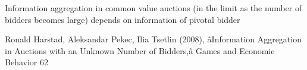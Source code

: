 \cite{kremer2002information}
Information aggregation in common value auctions (in the limit as the number of bidders becomes large)
depends on information of pivotal bidder


 Ronald Harstad, Aleksandar Pekec, Ilia Tsetlin (2008), âInformation Aggregation in
Auctions with an Unknown Number of Bidders,â Games and Economic Behavior 62













